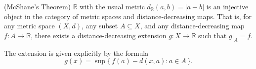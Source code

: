 (McShane's Theorem) $\mathbb{R}$ with the usual metric $d_{\mathbb{R}}(a, b) = |a - b|$ is an injective object in the category of metric spaces and distance-decreasing maps. That is, for any metric space $(X, d)$, any subset $A \subseteq X$, and any distance-decreasing map $f: A \to \mathbb{R}$, there exists a distance-decreasing extension $g: X \to \mathbb{R}$ such that $g|_A = f$.

The extension is given explicitly by the formula
$$g(x) = \sup\{\, f(a) - d(x, a) : a \in A \,\}.$$
